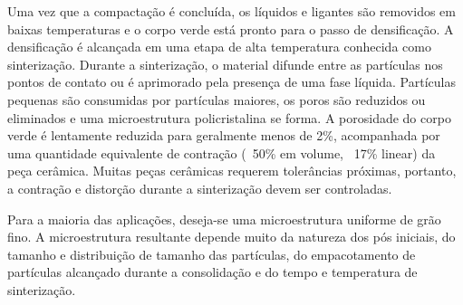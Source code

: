 Uma vez que a compactação é concluída, os líquidos e ligantes são removidos em baixas temperaturas e o corpo verde está pronto para o passo de densificação. A densificação é alcançada em uma etapa de alta temperatura conhecida como sinterização. Durante a sinterização, o material difunde entre as partículas nos pontos de contato ou é aprimorado pela presença de uma fase líquida. Partículas pequenas são consumidas por partículas maiores, os poros são reduzidos ou eliminados e uma microestrutura policristalina se forma. A porosidade do corpo verde é lentamente reduzida para geralmente menos de 2\%, acompanhada por uma quantidade equivalente de contração (~50\% em volume, ~17\% linear) da peça cerâmica. Muitas peças cerâmicas requerem tolerâncias próximas, portanto, a contração e distorção durante a sinterização devem ser controladas.

Para a maioria das aplicações, deseja-se uma microestrutura uniforme de grão fino. A microestrutura resultante depende muito da natureza dos pós iniciais, do tamanho e distribuição de tamanho das partículas, do empacotamento de partículas alcançado durante a consolidação e do tempo e temperatura de sinterização.


